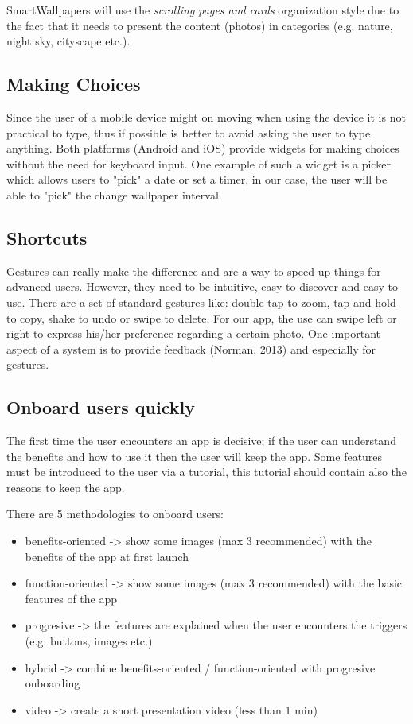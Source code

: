 \documentclass[]{article}
\begin{document}
	SmartWallpapers will use the \textit{scrolling pages and cards} organization style due to the fact that it needs to present the content (photos) in categories (e.g. nature, night sky, cityscape etc.).

	\subsection{Making Choices}
	Since the user of a mobile device might  on moving when using the device it is not practical to type, thus if possible is better to avoid asking the user to type anything. Both platforms (Android and iOS) provide widgets for making choices without the need for keyboard input. One example of such a widget is a picker which allows users to "pick" a date or set a timer, in our case, the user will be able to "pick" the change wallpaper interval.

	\subsection{Shortcuts}
	Gestures can really make the difference and are a way to speed-up things for advanced users. However, they need to be intuitive, easy to discover and easy to use. There are a set of standard gestures like: double-tap to zoom, tap and hold to copy, shake to undo or swipe to delete. For our app, the use can swipe left or right to express his/her preference regarding a certain photo. One important aspect of a system is to provide feedback (Norman, 2013) and especially for gestures.


	\subsection{Onboard users quickly}
	The first time the user encounters an app is decisive; if the user can understand the benefits and how to use it then the user will keep the app.
Some features must be introduced to the user via a tutorial, this tutorial should contain also the reasons to keep the app.

	There are 5 methodologies to onboard users:
	
	\begin{itemize}
	
		\item benefits-oriented -> show some images (max 3 recommended) with the benefits of the app at first launch

		\item function-oriented -> show some images (max 3 recommended) with the basic features of the app

		\item progresive        -> the features are explained when the user encounters the triggers (e.g. buttons, images etc.)

		\item hybrid            -> combine benefits-oriented / function-oriented with progresive onboarding 
		
		\item video -> create a short presentation video (less than 1 min) 

	\end{itemize}
	
\end{document}
